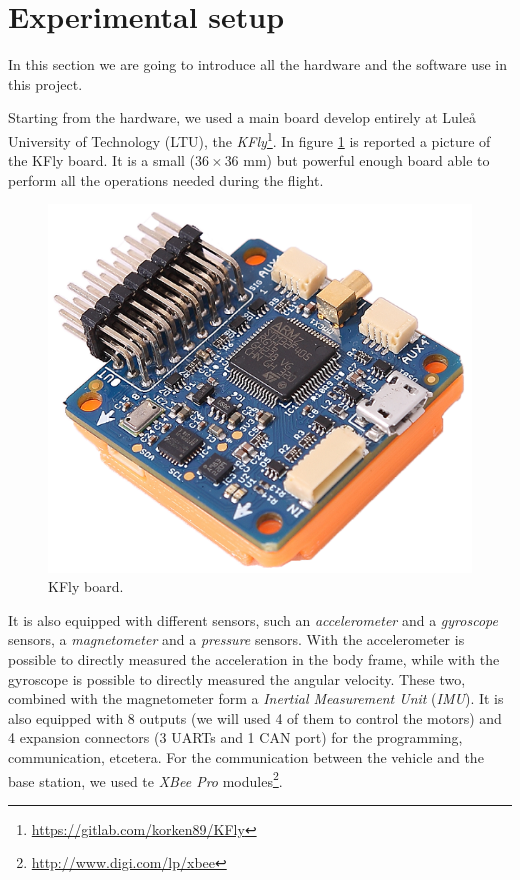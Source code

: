 \section{Experimental setup}

In this section we are going to introduce all the hardware and the software use in this project. 

\noindent Starting from the hardware, we used a main board develop entirely at Lule\r{a} University of Technology (LTU), the \textit{KFly}\footnote{\url{https://gitlab.com/korken89/KFly}}. In figure \ref{fig:KFly} is reported a picture of the KFly board. It is a small ($36\times 36$ mm) but powerful enough board able to perform all the operations needed during the flight.

\begin{figure}[h] 
	\centering
   	\includegraphics[scale = 0.45]{./images/KFly.png}
   	\caption{KFly board.}
   	\label{fig:KFly}
\end{figure} 

\noindent It is also equipped with different sensors, such an \textit{accelerometer} and a \textit{gyroscope} sensors, a \textit{magnetometer} and a \textit{pressure} sensors. With the accelerometer is possible to directly measured the acceleration in the body frame, while with the gyroscope is possible to directly measured the angular velocity. These two, combined with the magnetometer form a \textit{Inertial Measurement Unit} (\textit{IMU}). It is also equipped with 8 outputs (we will used 4 of them to control the motors) and 4 expansion connectors (3 UARTs and 1 CAN port) for the programming, communication, etcetera. For the communication between the vehicle and the base station, we used te \textit{XBee Pro} modules\footnote{\url{http://www.digi.com/lp/xbee}}.

